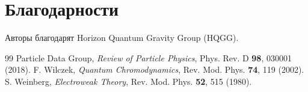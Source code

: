 \documentclass[12pt,a4paper]{article}
\begin{document}
\section*{Благодарности}

Авторы благодарят Horizon Quantum Gravity Group (HQGG).

\begin{thebibliography}{99}
 Particle Data Group, \textit{Review of Particle Physics}, Phys. Rev. D \textbf{98}, 030001 (2018).
 F. Wilczek, \textit{Quantum Chromodynamics}, Rev. Mod. Phys. \textbf{74}, 119 (2002).
 S. Weinberg, \textit{Electroweak Theory}, Rev. Mod. Phys. \textbf{52}, 515 (1980).
\end{thebibliography}
\end{document}
